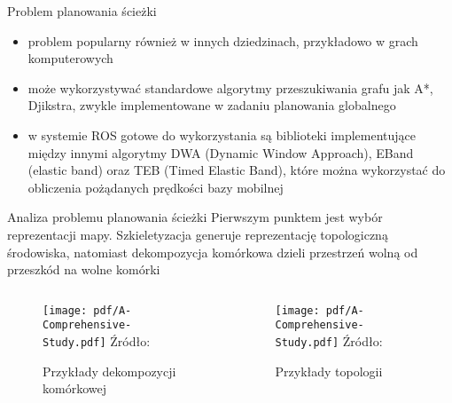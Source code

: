 \begin{frame}
{Problem planowania ścieżki}
\begin{itemize}
	\item problem popularny również w innych dziedzinach, przykładowo w grach komputerowych \cite{robotics_and_games}
	\item może wykorzystywać standardowe algorytmy przeszukiwania grafu jak A*, Djikstra, zwykle implementowane w zadaniu planowania globalnego
	\item w systemie ROS gotowe do wykorzystania są biblioteki implementujące między innymi algorytmy DWA (Dynamic Window Approach), EBand (elastic band) oraz TEB (Timed Elastic Band), które można wykorzystać do obliczenia pożądanych prędkości bazy mobilnej
\end{itemize}
\end{frame}

\begin{frame}
{Analiza problemu planowania ścieżki}
	Pierwszym punktem jest wybór reprezentacji mapy.
	Szkieletyzacja generuje reprezentację topologiczną środowiska, natomiast dekompozycja komórkowa dzieli przestrzeń wolną od przeszkód na wolne komórki	
	\begin{columns}
		\begin{column}{0.5\textwidth}
			\begin{figure}
				\begin{center}
					\texttt{[image: pdf/A-Comprehensive-Study.pdf]}
					\hspace*{5pt}\hbox{\scriptsize{Źródło:}}
					\caption{Przykłady dekompozycji komórkowej }
				\end{center}
			\end{figure}
		\end{column}
		\begin{column}{0.5\textwidth}  %
						\begin{figure}
				\begin{center}
					\texttt{[image: pdf/A-Comprehensive-Study.pdf]}
					\hspace*{5pt}\hbox{\scriptsize{Źródło:}}
					\caption{Przykłady topologii}
				\end{center}
			\end{figure}
		\end{column}
	\end{columns}
\end{frame}

